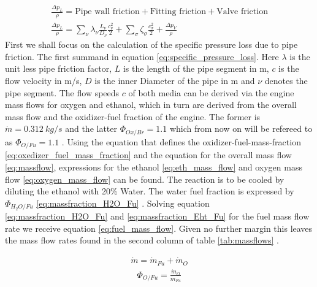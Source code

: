                 \begin{align}
                    \frac{\Delta p_L}{\rho} = \text{Pipe wall friction} + \text{Fitting friction} + \text{Valve friction} \\
                    \frac{\Delta p_L}{\rho} = \sum_{\nu} \lambda_{\nu} \frac{L_{\nu}}{D_{\nu}} \frac{c_{\nu}^2}{2} + \sum_{\sigma} \zeta_{\sigma} \frac{c_{\sigma}^2}{2} + \frac{\Delta p_V}{\rho}\label{eq:specific_pressure_loss}
                \end{align}
                First we shall focus on the calculation of the specific pressure loss due to pipe friction. The first summand in equation \ref{eq:specific_pressure_loss}. Here $\lambda$ is the unit less pipe friction factor, $L$ is the length of the pipe segment in \unit{m}, $c$ is the flow velocity in \unit{m/s}, $D$ is the inner Diameter of the pipe in \unit{m} and $\nu$ denotes the pipe segment.
                The flow speeds $c$ of both media can be derived via the engine mass flows for oxygen and ethanol, which in turn are derived from the overall mass flow and the oxidizer-fuel fraction of the engine. The former is $\dot{m} = \qty{0.312}{kg/s}$ and the latter $\Phi_{Ox/Br} = 1.1$ which from now on will be refereed to as $\Phi_{O/Fu} = 1.1$ \cite[22]{mayer:2023}. Using the equation that defines the oxidizer-fuel-mass-fraction \ref{eq:oxedizer_fuel_mass_fraction} and the equation for the overall mass flow \ref{eq:massflow}, expressions for the ethanol \ref{eq:eth_mass_flow} and oxygen mass flow \ref{eq:oxygen_mass_flow} can be found. The reaction is to be cooled by diluting the ethanol with 20\% Water. The water fuel fraction is expressed by $\Phi_{H_2O/Fu}$ \ref{eq:massfraction_H2O_Fu} \cite[3]{mayer:2023}. Solving equation \ref{eq:massfraction_H2O_Fu} and \ref{eq:massfraction_Eht_Fu} for the fuel mass flow rate we receive equation \ref{eq:fuel_mass_flow}. Given no further margin this leaves the mass flow rates found in the second column of table \ref{tab:massflows} .
                \begin{multicols}{2}
                    \begin{align} 
                        \dot{m} = \dot{m}_{Fu} + \dot{m}_{O} \label{eq:massflow}
                    \end{align}
                    \begin{align}
                        \Phi_{O/Fu} = \frac{\dot{m}_{O}}{\dot{m}_{Fu}} \label{eq:oxedizer_fuel_mass_fraction}
                    \end{align}
                \end{multicols}

